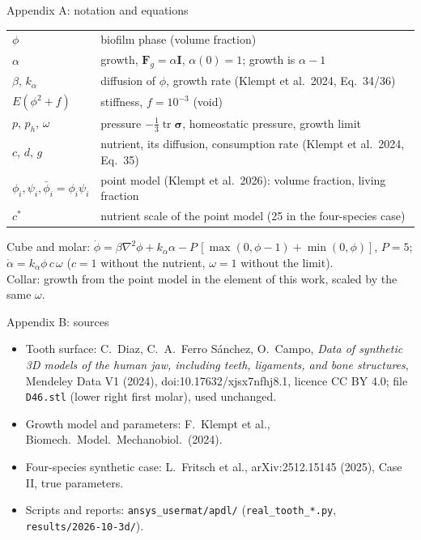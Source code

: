 \documentclass[aspectratio=169,11pt]{beamer}
\begin{document}
\appendix
\begin{frame}{Appendix A: notation and equations}
\small
\begin{tabular}{@{}ll@{}}
\toprule
$\phi$ & biofilm phase (volume fraction) \\
$\alpha$ & growth, $\mathbf F_g=\alpha\mathbf I$, $\alpha(0)=1$; growth is $\alpha-1$ \\
$\beta$, $k_\alpha$ & diffusion of $\phi$, growth rate (Klempt et al.\ 2024, Eq.\ 34/36) \\
$E(\phi^2+f)$ & stiffness, $f=10^{-3}$ (void) \\
$p$, $p_h$, $\omega$ & pressure $-\tfrac13\operatorname{tr}\boldsymbol\sigma$, homeostatic pressure, growth limit \\
$c$, $d$, $g$ & nutrient, its diffusion, consumption rate (Klempt et al.\ 2024, Eq.\ 35) \\
$\phi_i,\psi_i,\bar\phi_i=\phi_i\psi_i$ & point model (Klempt et al.\ 2026): volume fraction, living fraction \\
$c^*$ & nutrient scale of the point model (25 in the four-species case) \\
\bottomrule
\end{tabular}

\vspace{6pt}
Cube and molar: $\dot\phi=\beta\nabla^2\phi+k_\alpha\alpha-P\,[\max(0,\phi-1)+\min(0,\phi)]$, $P=5$;
$\dot\alpha=k_\alpha\phi\,c\,\omega$ ($c=1$ without the nutrient, $\omega=1$ without the limit).\\
Collar: growth from the point model in the element of this work, scaled by the same $\omega$.
\end{frame}

\begin{frame}{Appendix B: sources}
\small
\begin{itemize}\setlength\itemsep{5pt}
\item Tooth surface: C.~Diaz, C.~A.~Ferro S\'anchez, O.~Campo, \emph{Data of synthetic 3D models of the human jaw,
      including teeth, ligaments, and bone structures}, Mendeley Data V1 (2024), doi:10.17632/xjsx7nfhj8.1,
      licence CC BY 4.0; file \texttt{D46.stl} (lower right first molar), used unchanged.
\item Growth model and parameters: F.~Klempt et al., Biomech.\ Model.\ Mechanobiol.\ (2024).
\item Four-species synthetic case: L.~Fritsch et al., arXiv:2512.15145 (2025), Case II, true parameters.
\item Scripts and reports: \texttt{ansys\_usermat/apdl/} (\texttt{real\_tooth\_*.py}, \texttt{results/2026-10-3d/}).
\end{itemize}
\end{frame}
\end{document}
